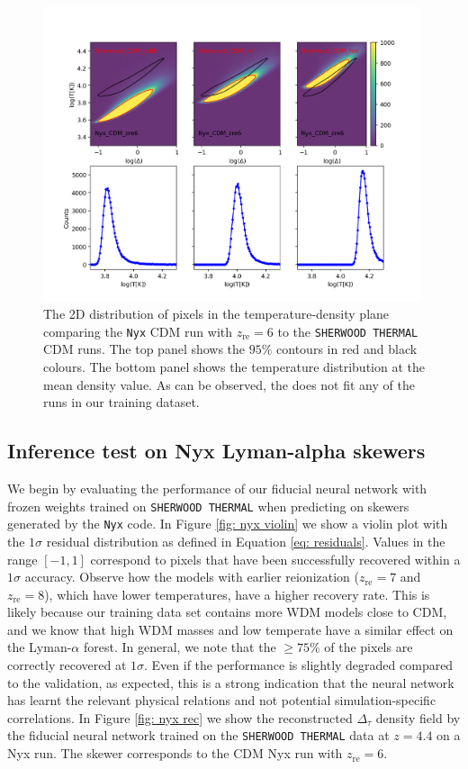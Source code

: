\begin{figure}
    \centering
    \includegraphics[width=0.99\textwidth,trim={5cm 0 3cm 4cm},clip]{img/ML/TD_plane_nyx_sher.png}
    \caption{The 2D distribution of pixels in the temperature-density plane comparing the \texttt{Nyx} CDM run with $z_\mathrm{re}=6$ to the \texttt{SHERWOOD THERMAL} CDM runs. The top panel shows the $95\%$ contours in red and black colours. The bottom panel shows the temperature distribution at the mean density value. As can be observed, the  does not fit any of the runs in our training dataset.}
    \label{fig: nyx TD}
\end{figure}

\subsection{Inference test on Nyx Lyman-alpha skewers}
We begin by evaluating the performance of our fiducial neural network with frozen weights trained on \texttt{SHERWOOD THERMAL} when predicting on skewers generated by the \texttt{Nyx} code. In Figure \ref{fig: nyx violin} we show a violin plot with the $1\sigma$ residual distribution as defined in Equation \ref{eq: residuals}. Values in the range $[-1,1]$ correspond to pixels that have been successfully recovered within a $1\sigma$ accuracy. Observe how the models with earlier reionization ($z_\mathrm{re}=7$ and $z_\mathrm{re}=8$), which have lower temperatures, have a higher recovery rate. This is likely because our training data set contains more WDM models close to CDM, and we know that high WDM masses and low temperate have a similar effect on the Lyman-$\alpha$ forest. In general, we note that the $\geq 75 \%$ of the pixels are correctly recovered at $1\sigma$. Even if the performance is slightly degraded compared to the  validation, as expected, this is a strong indication that the neural network has learnt the relevant physical relations and not potential simulation-specific correlations. In Figure \ref{fig: nyx rec} we show the reconstructed $\Delta_\tau$ density field by the fiducial neural network trained on the \texttt{SHERWOOD THERMAL} data at $z=4.4$ on a Nyx run. The skewer corresponds to the CDM Nyx run with $z_\mathrm{re}=6$.

